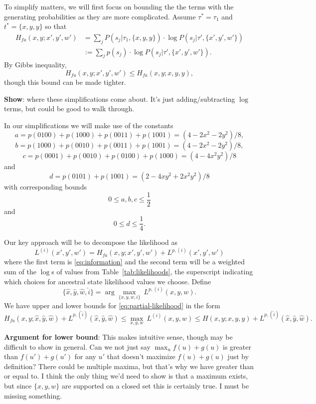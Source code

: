 \documentclass[a4paper]{article}
\begin{document}
To simplify matters, we will first focus on bounding the the terms with the generating probabilities as they are more complicated.
Assume $\tau^*=\tau_1$ and $t^*=\{x,y,y\}$ so that
\begin{align}
\label{eq:information}
H_{fa}(x, y;x', y', w') &= \sum_{j} P(s_j | \tau_1, \{x,y,y\}) \cdot \log P(s_j | \tau', \{x',y',w'\}) \nonumber \\ 
&:= \sum_{j} p(s_j) \cdot \log P(s_j | \tau', \{x',y',w'\}).
\end{align}
By Gibbs inequality,
$$
H_{fa}(x, y;x', y', w') \le H_{fa}(x, y;x, y, y),
$$
though this bound can be made tighter.

\textbf{Show}: where these simplifications come about.
It's just adding/subtracting $\log$ terms, but could be good to walk through.

In our simplifications we will make use of the constants
$$
a = p(0100) + p(1000) + p(0011) + p(1001) = (4-2x^2-2y^2)/8,
$$
$$
b = p(1000) + p(0010) + p(0011) + p(1001) = (4-2x^2-2y^2)/8,
$$
$$
c = p(0001) + p(0010) + p(0100) + p(1000) = (4-4x^2y^2)/8
$$
and
$$
d = p(0101) + p(1001) = (2-4xy^2+2x^2y^2)/8
$$
with corresponding bounds
$$
0 \le a,b,c \le \frac{1}{2}
$$
and
$$
0 \le d \le \frac{1}{4}.
$$

Our key approach will be to decompose the likelihood as
\begin{equation}
\label{eq:partial-likelihood}
L^{(i)}(x', y', w') = H_{fa}(x,y;x',y',w') + L^{p,(i)}(x',y',w')
\end{equation}
where the first term is \eqref{eq:information} and the second term will be a weighted sum of the $\log$s of values from Table~\ref{tab:likelihoods}, the superscript indicating which choices for ancestral state likelihood values we choose.
Define
$$
\{\hat{x}, \hat{y}, \hat{w}, \hat{i}\} = \arg\max_{\{x,y,w,i\}} \ L^{p,(i)}(x,y,w).
$$
We have upper and lower bounds for \eqref{eq:partial-likelihood} in the form
$$
H_{fa}(x,y; \hat{x}, \hat{y}, \hat{w}) + L^{p,(\hat{i})}(\hat{x}, \hat{y}, \hat{w}) \le \max_{x,y,w} \ L^{(i)}(x,y,w) \le H(x,y;x,y,y) + L^{p,(\hat{i})}(\hat{x}, \hat{y}, \hat{w}).
$$

\textbf{Argument for lower bound}: This makes intuitive sense, though may be difficult to show in general.
Can we not just say $\max_u f(u) + g(u)$ is greater than $f(u') + g(u')$ for any $u'$ that doesn't maximize $f(u) + g(u)$ just by definition?
There could be multiple maxima, but that's why we have greater than or equal to.
I think the only thing we'd need to show is that a maximum exists, but since $\{x,y,w\}$ are supported on a closed set this is certainly true.
I must be missing something.
\end{document}
